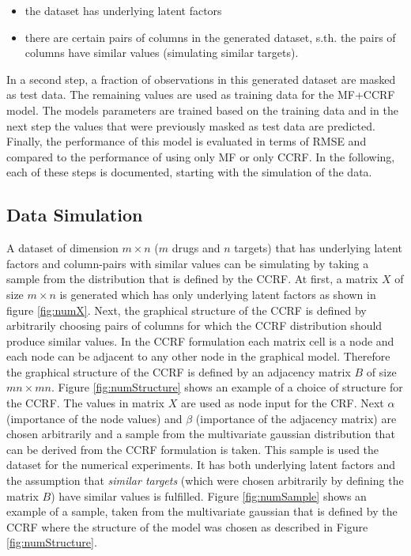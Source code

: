 \documentclass{sfuthesis}
\begin{document}
\begin{itemize}
\item the dataset has underlying latent factors
\item there are certain pairs of columns in the generated dataset, s.th. the pairs of columns have similar values (simulating similar targets).
\end{itemize}

In a second step, a fraction of observations in this generated dataset are masked as test data. The remaining values are used as training data for the MF+CCRF model. The models parameters are trained based on the training data and in the next step the values that were previously masked as test data are predicted. Finally, the performance of this model is evaluated in terms of RMSE and compared to the performance of using only MF or only CCRF.
In the following, each of these steps is documented, starting with the simulation of the data.

\subsection{Data Simulation}

A dataset of dimension $m \times n$ ($m$ drugs and $n$ targets) that has underlying latent factors and column-pairs with similar values can be simulating by taking a sample from the distribution that is defined by the CCRF. At first, a matrix $X$ of size $m \times n$ is generated which has only underlying latent factors as shown in figure \ref{fig:numX}. Next, the graphical structure of the CCRF is defined by arbitrarily choosing pairs of columns for which the CCRF distribution should produce similar values. In the CCRF formulation each matrix cell is a node and each node can be adjacent to any other node in the graphical model. Therefore the graphical structure of the CCRF is defined by an adjacency matrix $B$ of size $mn \times mn$. Figure \ref{fig:numStructure} shows an example of a choice of structure for the CCRF.  The values in matrix $X$ are used as node input for the CRF. Next $\alpha$ (importance of the node values) and $\beta$ (importance of the adjacency matrix) are chosen arbitrarily and a sample from the multivariate gaussian distribution that can be derived from the CCRF formulation is taken. This sample is used the dataset for the numerical experiments. It has both underlying latent factors and the assumption that \textit{similar targets} (which were chosen arbitrarily by defining the matrix $B$) have similar values is fulfilled. Figure \ref{fig:numSample} shows an example of a sample, taken from the multivariate gaussian that is defined by the CCRF where the structure of the model was chosen as described in Figure \ref{fig:numStructure}.
\end{document}
